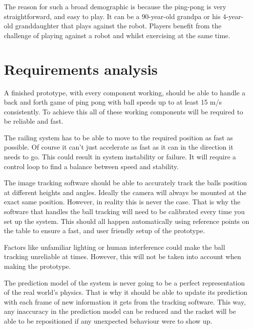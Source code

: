 The reason for such a broad demographic is because the ping-pong is very straightforward, and easy to play. It can be a 90-year-old grandpa or his 4-year-old granddaughter that plays against the robot. Players benefit from the challenge of playing against a robot and whilst exercising at the same time.

\section{Requirements analysis}

A finished prototype, with every component working, should be able to handle a back and forth game of ping pong with ball speeds up to at least 15 m/s consistently. To achieve this all of these working components will be required to be reliable and fast.

The railing system has to be able to move to the required position as fast as possible. Of course it can't just accelerate as fast as it can in the direction it needs to go. This could result in system instability or failure. It will require a control loop to find a balance between speed and stability.

The image tracking software should be able to accurately track the balls position at different heights and angles. Ideally the camera will always be mounted at the exact same position. However, in reality this is never the case. That is why the software that handles the ball tracking will need to be calibrated every time you set up the system. This should all happen automatically using reference points on the table to ensure a fast, and user friendly setup of the prototype.

Factors like unfamiliar lighting or human interference could make the ball tracking unreliable at times. However, this will not be taken into account when making the prototype.

The prediction model of the system is never going to be a perfect representation of the real world's physics. That is why it should be able to update its prediction with each frame of new information it gets from the tracking software. This way, any inaccuracy in the prediction model can be reduced and the racket will be able to be repositioned if any unexpected behaviour were to show up.